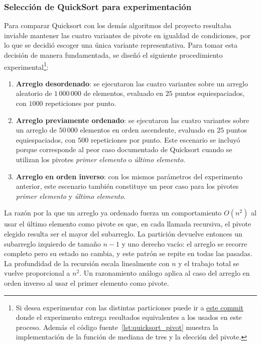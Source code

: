 \subsubsection{Selección de QuickSort para experimentación}\label{sec:quicksort_seleccion}

Para comparar Quicksort con los demás algoritmos del proyecto resultaba inviable mantener las cuatro variantes de pivote en igualdad de condiciones, por lo que se decidió escoger una única variante representativa. Para tomar esta decisión de manera fundamentada, se diseñó el siguiente procedimiento experimental\footnote{Si desea experimentar con las distintas particiones puede ir a \href{https://github.com/ProgramsMFHM/Conquer/commit/9c24fd1de689c9f99110c28e60c8034d90bef471}{este commit} donde el experimento entrega resultados equivalentes a los usados en este proceso. Además el código fuente~\ref{lst:quicksort_pivot} muestra la implementación de la función de mediana de tres y la elección del pivote.}:

\begin{enumerate}
    \item \textbf{Arreglo desordenado}: se ejecutaron las cuatro variantes sobre un arreglo aleatorio de $1\,000\,000$ de elementos, evaluado en $25$ puntos equiespaciados, con $1000$ repeticiones por punto.
    \item \textbf{Arreglo previamente ordenado}: se ejecutaron las cuatro variantes sobre un arreglo de $50\,000$ elementos en orden ascendente, evaluado en $25$ puntos equiespaciados, con $500$ repeticiones por punto. Este escenario se incluyó porque corresponde al peor caso documentado de Quicksort cuando se utilizan los pivotes \textit{primer elemento} o \textit{último elemento}.
    \item \textbf{Arreglo en orden inverso}: con los mismos parámetros del experimento anterior, este escenario también constituye un peor caso para los pivotes \textit{primer elemento} y \textit{último elemento}.
\end{enumerate}

La razón por la que un arreglo ya ordenado fuerza un comportamiento $O(n^2)$ al usar el último elemento como pivote es que, en cada llamada recursiva, el pivote elegido resulta ser el mayor del subarreglo. La partición devuelve entonces un subarreglo izquierdo de tamaño $n-1$ y uno derecho vacío: el arreglo se recorre completo pero su estado no cambia, y este patrón se repite en todas las pasadas. La profundidad de la recursión escala linealmente con $n$ y el trabajo total se vuelve proporcional a $n^2$. Un razonamiento análogo aplica al caso del arreglo en orden inverso al usar el primer elemento como pivote.

